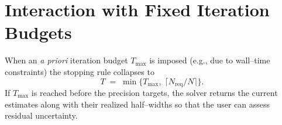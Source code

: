 \section{Interaction with Fixed Iteration Budgets}
\label{subsec:conv_budget}

When an \emph{a priori} iteration budget $T_{\max}$ is imposed (e.g., due to
wall--time constraints) the stopping rule collapses to
\begin{equation}
  T \;=\; \min\!\bigl\{T_{\max},\;\lceil N_{\text{req}}/N \rceil\bigr\}.
\end{equation}
If $T_{\max}$ is reached before the precision targets, the solver returns the
current estimates along with their realized half--widths so that the user can
assess residual uncertainty.


